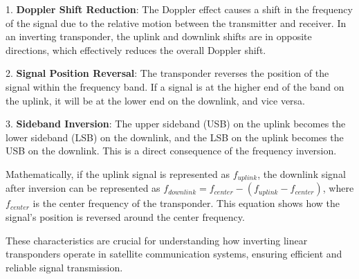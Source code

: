 1. \textbf{Doppler Shift Reduction}: The Doppler effect causes a shift in the frequency of the signal due to the relative motion between the transmitter and receiver. In an inverting transponder, the uplink and downlink shifts are in opposite directions, which effectively reduces the overall Doppler shift.

2. \textbf{Signal Position Reversal}: The transponder reverses the position of the signal within the frequency band. If a signal is at the higher end of the band on the uplink, it will be at the lower end on the downlink, and vice versa.

3. \textbf{Sideband Inversion}: The upper sideband (USB) on the uplink becomes the lower sideband (LSB) on the downlink, and the LSB on the uplink becomes the USB on the downlink. This is a direct consequence of the frequency inversion.

Mathematically, if the uplink signal is represented as \( f_{uplink} \), the downlink signal after inversion can be represented as \( f_{downlink} = f_{center} - (f_{uplink} - f_{center}) \), where \( f_{center} \) is the center frequency of the transponder. This equation shows how the signal's position is reversed around the center frequency.

These characteristics are crucial for understanding how inverting linear transponders operate in satellite communication systems, ensuring efficient and reliable signal transmission.

